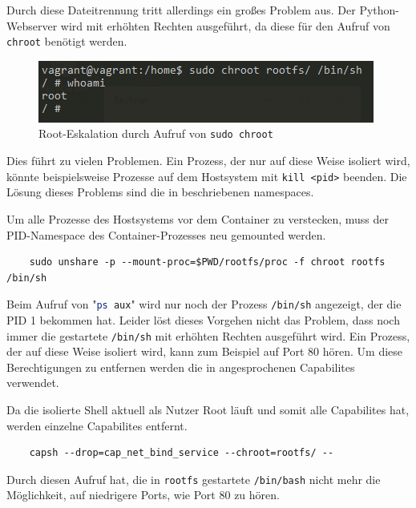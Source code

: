 Durch diese Dateitrennung tritt allerdings ein großes Problem aus. Der Python-Webserver wird mit erhöhten Rechten ausgeführt, da diese für den Aufruf von \texttt{chroot} benötigt werden.

\begin{figure}
	\begin{center}
		\includegraphics[scale=1]{bilder/chroot-whoami-root.png}
		\caption{Root-Eskalation durch Aufruf von \texttt{sudo chroot}}
		\label{fig:chrootWhoami}
	\end{center}
\end{figure}

Dies führt zu vielen Problemen. Ein Prozess, der nur auf diese Weise isoliert wird, könnte beispielsweise Prozesse auf dem Hostsystem mit \texttt{kill <pid>} beenden. Die Lösung dieses Problems sind die in  beschriebenen namespaces.

Um alle Prozesse des Hostsystems vor dem Container zu verstecken, muss der PID-Namespace des Container-Prozesses neu gemounted werden.
\begin{lstlisting}
	sudo unshare -p --mount-proc=$PWD/rootfs/proc -f chroot rootfs /bin/sh
\end{lstlisting}

Beim Aufruf von "\lstinline[language=bash]{ps aux}" wird nur noch der Prozess \texttt{/bin/sh} angezeigt, der die PID 1 bekommen hat. Leider löst dieses Vorgehen nicht das Problem, dass noch immer die gestartete \texttt{/bin/sh} mit erhöhten Rechten ausgeführt wird. Ein Prozess, der auf diese Weise isoliert wird, kann zum Beispiel auf Port 80 hören. Um diese Berechtigungen zu entfernen werden die in  angesprochenen Capabilites verwendet.

Da die isolierte Shell aktuell als Nutzer Root läuft und somit alle Capabilites hat, werden einzelne Capabilites entfernt.
\begin{lstlisting}
	capsh --drop=cap_net_bind_service --chroot=rootfs/ --
\end{lstlisting}

Durch diesen Aufruf hat, die in \texttt{rootfs} gestartete \texttt{/bin/bash} nicht mehr die Möglichkeit, auf niedrigere Ports, wie Port 80 zu hören.


